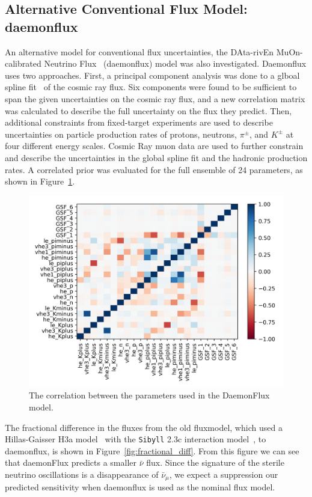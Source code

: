 \documentclass[main.tex]{subfiles}
\begin{document}
\subsection{Alternative Conventional Flux Model: daemonflux}\label{sec:daemon_sense}
An alternative model for conventional flux uncertainties, the DAta-rivEn MuOn-calibrated Neutrino Flux~\cite{yanez2023daemonflux} (daemonflux) model was also investigated. 
Daemonflux uses two approaches. 
First, a principal component analysis was done to a glboal spline fit~\cite{dembinski2017datadriven} of the cosmic ray flux. 
Six components were found to be sufficient to span the given uncertainties on the cosmic ray flux, and a new correlation matrix was calculated to describe the full uncertainty on the flux they predict. 
Then, additional constraints from fixed-target experiments are used to describe uncertainties on particle production rates of protons, neutrons, $\pi^{\pm}$, and $K^{\pm}$ at four different energy scales. 
Cosmic Ray muon data are used to further constrain and describe the uncertainties in the global spline fit and the hadronic production rates. 
A correlated prior was evaluated for the full ensemble of 24 parameters, as shown in Figure~\ref{fig:daemon_cor}.
\begin{figure}
    \centering
    \includegraphics[width=0.7\linewidth]{figures/daemon_cov.png}
    \caption{The correlation between the parameters used in the DaemonFlux model.}\label{fig:daemon_cor}
\end{figure}


The fractional difference in the fluxes from the old fluxmodel, which used a Hillas-Gaisser H3a model~\cite{GAISSER2012801} with the \texttt{Sibyll} 2.3c interaction model~\cite{Riehn:2017mfm}, to daemonflux, is shown in Figure~\ref{fig:fractional_diff}. 
From this figure we can see that daemonFlux predicts a smaller $\bar{\nu}$ flux. 
Since the signature of the sterile neutrino oscillations is a disappearance of $\bar{\nu}_{\mu}$, we expect a suppression our predicted sensitivity when daemonflux is used as the nominal flux model.
\end{document}
